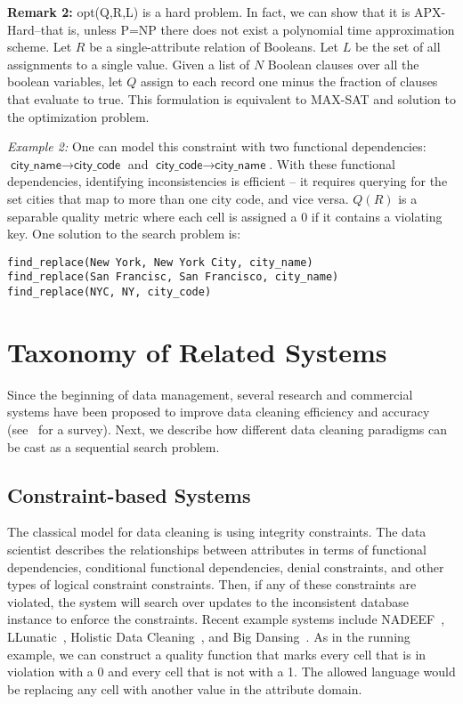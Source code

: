 \vspace{0.5em} \noindent \textbf{Remark 2: } \textsf{opt(Q,R,L)} is a hard problem. In fact, we can show that it is APX-Hard--that is, unless P=NP there does not exist a polynomial time approximation scheme.
Let $R$ be a single-attribute relation of Booleans. Let $L$ be the set of all assignments to a single value.
Given a list of $N$ Boolean clauses over all the boolean variables, let $Q$ assign to each record one minus the fraction of clauses that evaluate to true. This formulation is equivalent to MAX-SAT and solution to the optimization problem.


\vspace{0.5em} \noindent \emph{Example 2: } 
One can model this constraint with two functional dependencies: $\textsf{city\_name} \rightarrow \textsf{city\_code}$ and $\textsf{city\_code} \rightarrow \textsf{city\_name}$.
With these functional dependencies, identifying inconsistencies is efficient -- it requires querying for the set cities that map to more than one city code, and vice versa. 
$Q(R)$ is a separable quality metric where each cell is assigned a 0  if it contains a violating key. One solution to the search problem is:
\begin{lstlisting}
find_replace(New York, New York City, city_name)
find_replace(San Francisc, San Francisco, city_name)
find_replace(NYC, NY, city_code)
\end{lstlisting}

\section{Taxonomy of Related Systems}
Since the beginning of data management, several research and commercial systems have been proposed to improve data cleaning efficiency and accuracy (see~\cite{rahm2000data} for a survey).
Next, we describe how different data cleaning paradigms can be cast as a sequential search problem.

\subsection{Constraint-based Systems}
The classical model for data cleaning is using integrity constraints. 
The data scientist describes the relationships between attributes in terms of functional dependencies, conditional functional dependencies, denial constraints, and other types of logical constraint constraints.
Then, if any of these constraints are violated, the system will search over updates to the inconsistent database instance to enforce the constraints.
Recent example systems include NADEEF~\cite{DBLP:conf/sigmod/DallachiesaEEEIOT13}, LLunatic~\cite{geerts2013llunatic}, Holistic Data Cleaning~\cite{chu2013holistic}, and Big Dansing~\cite{khayyat2015bigdansing}.
As in the running example, we can construct a quality function that marks every cell that is in violation with a 0 and every cell that is not with a 1.
The allowed language would be replacing any cell with another value in the attribute domain.

